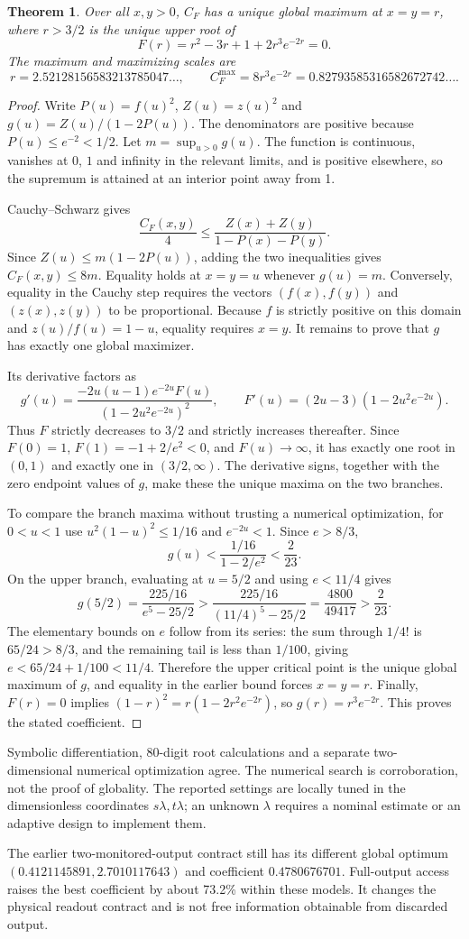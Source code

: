 \documentclass[10pt,a4paper]{article}
\newtheorem{theorem}{Theorem}\newtheorem{proposition}[theorem]{Proposition}\newtheorem{lemma}[theorem]{Lemma}\newtheorem{corollary}[theorem]{Corollary}
\begin{document}
\begin{theorem}
Over all $x,y>0$, $C_F$ has a unique global maximum at $x=y=r$, where $r>3/2$ is the unique upper root of
\[
F(r)=r^2-3r+1+2r^3e^{-2r}=0.
\]
The maximum and maximizing scales are
\[
r=2.52128156583213785047\ldots,\qquad
C_F^{\max}=8r^3e^{-2r}=0.82793585316582672742\ldots.
\]
\end{theorem}
\begin{proof}
Write $P(u)=f(u)^2$, $Z(u)=z(u)^2$ and $g(u)=Z(u)/(1-2P(u))$. The denominators are positive because $P(u)\le e^{-2}<1/2$. Let $m=\sup_{u>0}g(u)$. The function is continuous, vanishes at $0$, $1$ and infinity in the relevant limits, and is positive elsewhere, so the supremum is attained at an interior point away from 1.

Cauchy--Schwarz gives
\[
\frac{C_F(x,y)}4\le
\frac{Z(x)+Z(y)}{1-P(x)-P(y)}.
\]
Since $Z(u)\le m(1-2P(u))$, adding the two inequalities gives $C_F(x,y)\le8m$. Equality holds at $x=y=u$ whenever $g(u)=m$. Conversely, equality in the Cauchy step requires the vectors $(f(x),f(y))$ and $(z(x),z(y))$ to be proportional. Because $f$ is strictly positive on this domain and $z(u)/f(u)=1-u$, equality requires $x=y$. It remains to prove that $g$ has exactly one global maximizer.

Its derivative factors as
\[
g'(u)=\frac{-2u(u-1)e^{-2u}F(u)}{(1-2u^2e^{-2u})^2},\qquad
F'(u)=(2u-3)(1-2u^2e^{-2u}).
\]
Thus $F$ strictly decreases to $3/2$ and strictly increases thereafter. Since $F(0)=1$, $F(1)=-1+2/e^2<0$, and $F(u)\to\infty$, it has exactly one root in $(0,1)$ and exactly one in $(3/2,\infty)$. The derivative signs, together with the zero endpoint values of $g$, make these the unique maxima on the two branches.

To compare the branch maxima without trusting a numerical optimization, for $0<u<1$ use $u^2(1-u)^2\le1/16$ and $e^{-2u}<1$. Since $e>8/3$,
\[
g(u)<\frac{1/16}{1-2/e^2}<\frac2{23}.
\]
On the upper branch, evaluating at $u=5/2$ and using $e<11/4$ gives
\[
g(5/2)=\frac{225/16}{e^5-25/2}>
\frac{225/16}{(11/4)^5-25/2}=\frac{4800}{49417}>\frac2{23}.
\]
The elementary bounds on $e$ follow from its series: the sum through $1/4!$ is $65/24>8/3$, and the remaining tail is less than $1/100$, giving $e<65/24+1/100<11/4$. Therefore the upper critical point is the unique global maximum of $g$, and equality in the earlier bound forces $x=y=r$. Finally, $F(r)=0$ implies $(1-r)^2=r(1-2r^2e^{-2r})$, so $g(r)=r^3e^{-2r}$. This proves the stated coefficient.
\end{proof}

Symbolic differentiation, 80-digit root calculations and a separate two-dimensional numerical optimization agree. The numerical search is corroboration, not the proof of globality. The reported settings are locally tuned in the dimensionless coordinates $s\lambda,t\lambda$; an unknown $\lambda$ requires a nominal estimate or an adaptive design to implement them.

The earlier two-monitored-output contract still has its different global optimum $(0.4121145891,2.7010117643)$ and coefficient $0.4780676701$. Full-output access raises the best coefficient by about 73.2\% within these models. It changes the physical readout contract and is not free information obtainable from discarded output.
\end{document}
